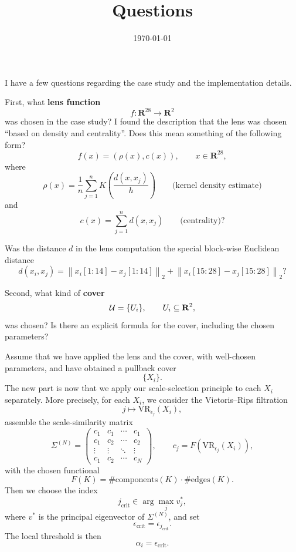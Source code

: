\documentclass[11pt,a4paper]{article}
\title{Questions}
\author{}
\date{\today}
\begin{document}
\maketitle

I have a few questions regarding the case study and the implementation details.

First, what \textbf{lens function}
\[
    f:\mathbf{R}^{28}\to\mathbf{R}^{2}
\]
was chosen in the case study? I found the description that the lens was chosen
\enquote{based on density and centrality}. Does this mean something of the
following form?
\[
    f(x) = (\rho(x),c(x)),
    \qquad x\in\mathbf{R}^{28},
\]
where
\[
    \rho(x)
    =
    \frac{1}{n}\sum_{j=1}^{n}
    K\left(\frac{d(x,x_j)}{h}\right)
    \qquad
    \mbox{(kernel density estimate)}
\]
and
\[
    c(x)
    =
    \sum_{j=1}^{n} d(x,x_j)
    \qquad
    \mbox{(centrality)}?
\]

Was the distance \(d\) in the lens computation the special block-wise Euclidean
distance
\[
    d(x_i,x_j)
    =
    \left\|x_i[1:14]-x_j[1:14]\right\|_2
    +
    \left\|x_i[15:28]-x_j[15:28]\right\|_2?
\]

Second, what kind of \textbf{cover}
\[
    {\cal U}=\{U_i\},
    \qquad U_i\subseteq\mathbf{R}^{2},
\]
was chosen? Is there an explicit formula for the cover, including the chosen
parameters?

Assume that we have applied the lens and the cover, with well-chosen parameters,
and have obtained a pullback cover
\[
    \{X_i\}.
\]
The new part is now that we apply our scale-selection principle to each \(X_i\)
separately. More precisely, for each \(X_i\), we consider the Vietoris--Rips
filtration
\[
    j\mapsto \mathrm{VR}_{\epsilon_j}(X_i),
\]
assemble the scale-similarity matrix
\[
    \Sigma^{(N)}
    =
    \left(
    \begin{array}{cccc}
        c_1 & c_1 & \cdots & c_1 \\
        c_1 & c_2 & \cdots & c_2 \\
        \vdots & \vdots & \ddots & \vdots \\
        c_1 & c_2 & \cdots & c_N
    \end{array}
    \right),
    \qquad
    c_j = F\left(\mathrm{VR}_{\epsilon_j}(X_i)\right),
\]
with the chosen functional
\[
    F(K)
    =
    \#\mbox{components}(K)\cdot \#\mbox{edges}(K).
\]
Then we choose the index
\[
    j_{\mathrm{crit}}
    \in
    \arg\max_j v_j^*,
\]
where \(v^*\) is the principal eigenvector of \(\Sigma^{(N)}\), and set
\[
    \epsilon_{\mathrm{crit}}
    =
    \epsilon_{j_{\mathrm{crit}}}.
\]
The local threshold is then
\[
    \alpha_i = \epsilon_{\mathrm{crit}}.
\]
\end{document}
